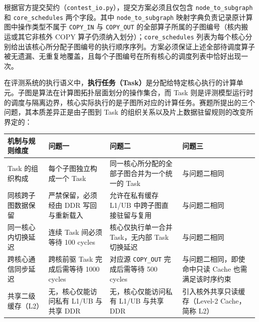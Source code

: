 \documentclass[anonymous,notoc]{gmcm2026}
\begin{document}
根据官方提交契约（\texttt{contest\_io.py}），提交方案必须且仅包含 \texttt{node\_to\_subgraph} 和 \texttt{core\_schedules} 两个字段。其中 \texttt{node\_to\_subgraph} 映射字典负责记录原计算图中操作类型不属于 \texttt{COPY\_IN} 与 \texttt{COPY\_OUT} 的全部算子所属的子图编号（核内搬运或其它非核外 COPY 算子仍须纳入划分）；\texttt{core\_schedules} 列表为每个核心分别给出该核心所分配子图编号的执行顺序序列。方案必须保证上述全部待调度算子被无遗漏、无重复地覆盖，且每个子图编号在所有核心的调度列表中恰好出现一次。

在评测系统的执行语义中，\textbf{执行任务（Task）}是分配给特定核心执行的计算单元。子图是算法在计算图拓扑层面划分的操作集合，而 Task 则是评测模型运行时的调度与隔离边界，核心实际执行的是子图所对应的计算任务。赛题所提出的三个问题，其本质差异正是由子图到 Task 的组织关系以及片上数据驻留规则的改变所界定的：

{\def\LTcaptype{table} %
\begin{table}[!htbp]\centering\small
\begin{tabular}{@{}
  >{\raggedright\arraybackslash}p{}
  >{\raggedright\arraybackslash}p{}
  >{\raggedright\arraybackslash}p{}
  >{\raggedright\arraybackslash}p{}@{}}
\toprule\noalign{}
\begin{minipage}[b]{\linewidth}\raggedright
机制与规则维度
\end{minipage} & \begin{minipage}[b]{\linewidth}\raggedright
问题一
\end{minipage} & \begin{minipage}[b]{\linewidth}\raggedright
问题二
\end{minipage} & \begin{minipage}[b]{\linewidth}\raggedright
问题三
\end{minipage} \\
\midrule\noalign{}


Task 的组织构成 & 每个子图独立构成一个 Task & 同一核心所分配的全部子图合并为一个统一的 Task & 与问题二相同 \\
同核跨子图数据保留 & 严禁保留，必须经由 DDR 写回与重新载入 & 允许在私有缓存 L1/UB 中跨子图直接驻留与复用 & 与问题二相同 \\
同一核心内切换延迟 & 连续 Task 间必须等待 100 cycles & 核心仅执行单一合并 Task，无内部 Task 切换延迟 & 与问题二相同 \\
跨核心通信同步延迟 & 跨核前驱 Task 完成后需等待 1000 cycles & 对应源 \texttt{COPY\_OUT} 完成后需等待 500 cycles & 与问题二相同，即使命中只读 Cache 也需满足该时序约束 \\
共享二级缓存（L2） & 无，核心仅能访问私有 L1/UB 与共享 DDR & 无，核心仅能访问私有 L1/UB 与共享 DDR & 引入核外共享只读缓存（Level-2 Cache，简称 L2） \\
\bottomrule\end{tabular}
\end{table}
}
\end{document}
